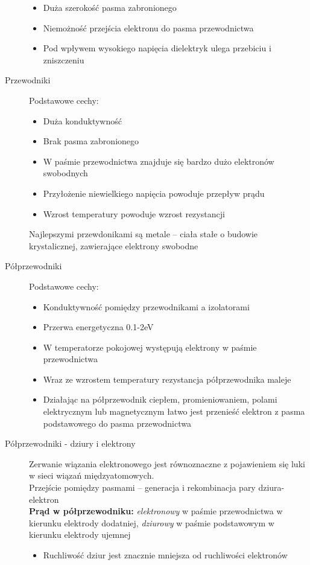 \documentclass[a4paper,11pt]{article}
\begin{document}
\begin{description}
\begin{itemize}
  \item Duża szerokość pasma zabronionego
  \item Niemożność przejścia elektronu do pasma przewodnictwa
  \item Pod wpływem wysokiego napięcia dielektryk ulega przebiciu i zniszczeniu
  \end{itemize}
\item[Przewodniki] Podstawowe cechy:
  \begin{itemize}
  \item Duża konduktywność
  \item Brak pasma zabronionego
  \item W paśmie przewodnictwa znajduje się bardzo dużo elektronów swobodnych
  \item Przyłożenie niewielkiego napięcia powoduje przepływ prądu
  \item Wzrost temperatury powoduje wzrost rezystancji
  \end{itemize}
  Najlepszymi przewdonikami są metale -- ciała stałe o budowie krystalicznej, zawierające elektrony swobodne
\item[Półprzewodniki] Podstawowe cechy:
  \begin{itemize}
  \item Konduktywność pomiędzy przewodnikami a izolatorami
  \item Przerwa energetyczna 0.1-2eV
  \item W temperatorze pokojowej występują elektrony w paśmie przewodnictwa
  \item Wraz ze wzrostem temperatury rezystancja półprzewodnika maleje
  \item Działając na półprzewodnik ciepłem, promieniowaniem, polami elektrycznym lub magnetycznym łatwo jest przenieść elektron z pasma podstawowego do pasma przewodnictwa
  \end{itemize}
\item[Półprzewodniki - dziury i elektrony] Zerwanie wiązania elektronowego jest równoznaczne z pojawieniem się luki w sieci wiązań międzyatomowych. \\
  Przejście pomiędzy pasmami -- generacja i rekombinacja pary dziura-elektron\\
  \textbf{Prąd w półprzewodniku:} \emph{elektronowy} w paśmie przewodnictwa w kierunku elektrody dodatniej, \emph{dziurowy} w paśmie podstawowym w kierunku elektrody ujemnej
  \begin{itemize}
  \item Ruchliwość dziur jest znacznie mniejsza od ruchliwości elektronów

\end{itemize}
\end{description}
\end{document}

